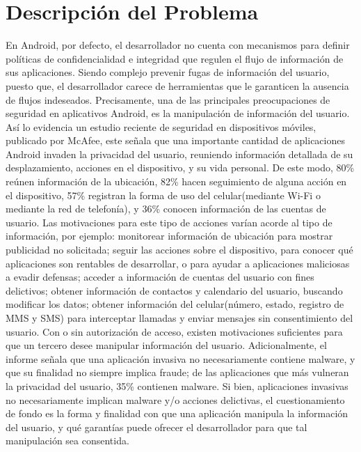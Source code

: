 \label{ch:problema}
\chapter{Descripción del Problema}

En Android, por defecto, el desarrollador no cuenta con mecanismos para
definir políticas de confidencialidad e integridad que regulen
el flujo de información de sus aplicaciones. Siendo complejo prevenir fugas de
información del usuario, puesto que, el desarrollador carece de herramientas que
le garanticen la ausencia de flujos indeseados.\newline
Precisamente, una de las principales preocupaciones de seguridad en aplicativos
Android, es la manipulación de información del usuario.
Así lo evidencia un
estudio reciente de seguridad en dispositivos móviles, publicado por
McAfee\cite{McAfeeReport}, este señala  que una importante cantidad de
aplicaciones Android invaden la privacidad del usuario, reuniendo información
detallada de su desplazamiento, acciones en el dispositivo, y su vida personal.
De este modo, 80\% reúnen información de la ubicación, 82\%
hacen seguimiento de alguna acción en el dispositivo, 57\%
registran la forma de uso del celular(mediante Wi-Fi o
mediante la red de telefonía), y 36\% conocen información de
las cuentas de usuario.\newline
Las motivaciones para este tipo de acciones varían acorde al tipo de
información, por ejemplo: monitorear información de ubicación para mostrar
publicidad no solicitada; seguir las acciones sobre el dispositivo, para conocer
qué aplicaciones son rentables de desarrollar, o para ayudar a aplicaciones
maliciosas a evadir defensas; acceder a información de cuentas del usuario con
fines delictivos; obtener información de contactos y calendario
del usuario, buscando modificar los datos; obtener información del
celular(número, estado, registro de MMS y SMS) para interceptar llamadas y
enviar mensajes sin consentimiento del usuario.\newline 
Con o sin autorización de acceso, existen motivaciones suficientes para que un
tercero desee manipular información del usuario.\newline
Adicionalmente, el informe señala que una aplicación invasiva no necesariamente
contiene malware, y que su finalidad no siempre implica fraude; de las
aplicaciones que más vulneran la privacidad del usuario, 35\% contienen
malware.\newline 
Si bien, aplicaciones invasivas no necesariamente implican malware y/o acciones
delictivas, el cuestionamiento de fondo es la forma y finalidad con que una
aplicación manipula la información del usuario, y qué garantías puede ofrecer el
desarrollador para que tal manipulación sea consentida.

